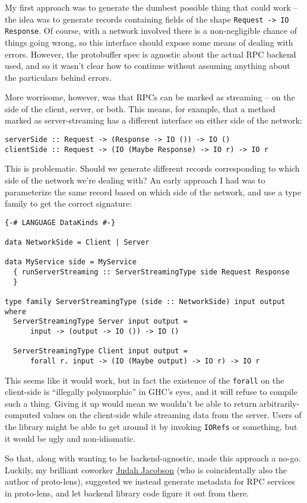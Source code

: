 My first approach was to generate the dumbest possible thing that could work -- the idea was to generate records containing fields of the shape \texttt{Request -> IO Response}. Of course, with a network involved there is a non-negligible chance of things going wrong, so this interface should expose some means of dealing with errors. However, the protobuffer spec is agnostic about the actual RPC backend used, and so it wasn't clear how to continue without assuming anything about the particulars behind errors.

More worrisome, however, was that RPCs can be marked as streaming -- on the side of the client, server, or both. This means, for example, that a method marked as server-streaming has a different interface on either side of the network:

\begin{verbatim}
serverSide :: Request -> (Response -> IO ()) -> IO ()
clientSide :: Request -> (IO (Maybe Response) -> IO r) -> IO r
\end{verbatim}
This is problematic. Should we generate different records corresponding to which side of the network we're dealing with? An early approach I had was to parameterize the same record based on which side of the network, and use a type family to get the correct signature:

\begin{verbatim}
{-# LANGUAGE DataKinds #-}

data NetworkSide = Client | Server

data MyService side = MyService
  { runServerStreaming :: ServerStreamingType side Request Response
  }

type family ServerStreamingType (side :: NetworkSide) input output where
  ServerStreamingType Server input output =
      input -> (output -> IO ()) -> IO ()

  ServerStreamingType Client input output =
      forall r. input -> (IO (Maybe output) -> IO r) -> IO r
\end{verbatim}
This seems like it would work, but in fact the existence of the \texttt{forall} on the client-side is ``illegally polymorphic'' in GHC's eyes, and it will refuse to compile such a thing. Giving it up would mean we wouldn't be able to return arbitrarily-computed values on the client-side while streaming data from the server. Users of the library might be able to get around it by invoking \texttt{IORefs} or something, but it would be ugly and non-idiomatic.

So that, along with wanting to be backend-agnostic, made this approach a no-go. Luckily, my brilliant coworker \href{https://github.com/judah}{Judah Jacobson} (who is coincidentally also the author of proto-lens), suggested we instead generate metadata for RPC services in proto-lens, and let backend library code figure it out from there.

